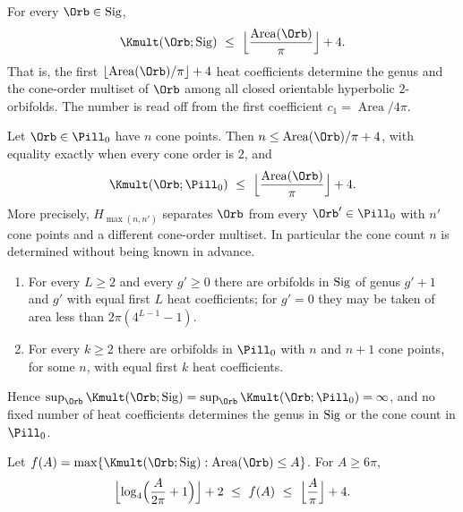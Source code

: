 \begin{corollary}\label{cor:sigarea}
For every $\Orb\in\Sig$,
\[
  \Kmult(\Orb;\Sig)\ \le\ \Bigl\lfloor\frac{\operatorname{Area}(\Orb)}{\pi}\Bigr\rfloor+4 .
\]
That is, the first $\lfloor\operatorname{Area}(\Orb)/\pi\rfloor+4$ heat coefficients determine the genus and
the cone-order multiset of $\Orb$ among all closed orientable hyperbolic $2$-orbifolds. The number is
read off from the first coefficient $c_1=\operatorname{Area}/4\pi$.
\end{corollary}

\begin{theorem}\label{thm:sigcount}
Let $\Orb\in\Pill_0$ have $n$ cone points. Then $n\le\operatorname{Area}(\Orb)/\pi+4$, with equality exactly
when every cone order is $2$, and
\[
  \Kmult(\Orb;\Pill_0)\ \le\ \Bigl\lfloor\frac{\operatorname{Area}(\Orb)}{\pi}\Bigr\rfloor+4 .
\]
More precisely, $H_{\max(n,n')}$ separates $\Orb$ from every $\Orb'\in\Pill_0$ with $n'$ cone points and a
different cone-order multiset. In particular the cone count $n$ is determined without being known in
advance.
\end{theorem}

\begin{theorem}\label{thm:signonuniform}
\leavevmode
\begin{enumerate}[label=(\alph*)]
\item For every $L\ge2$ and every $g'\ge0$ there are orbifolds in $\mathrm{Sig}$ of genus $g'+1$ and $g'$ with equal
  first $L$ heat coefficients; for $g'=0$ they may be taken of area less than $2\pi(4^{L-1}-1)$.
\item For every $k\ge2$ there are orbifolds in $\Pill_0$ with $n$ and $n+1$ cone points, for some $n$, with
  equal first $k$ heat coefficients.
\end{enumerate}
Hence $\sup_{\Orb}\Kmult(\Orb;\Sig)=\sup_{\Orb}\Kmult(\Orb;\Pill_0)=\infty$, and no fixed number of heat
coefficients determines the genus in $\mathrm{Sig}$ or the cone count in $\Pill_0$.
\end{theorem}

\begin{corollary}[Growth]\label{cor:siggrowth}
Let $f(A)=\max\{\Kmult(\Orb;\Sig):\operatorname{Area}(\Orb)\le A\}$. For $A\ge6\pi$,
\[
  \Bigl\lfloor\log_4\Bigl(\frac{A}{2\pi}+1\Bigr)\Bigr\rfloor+2\ \le\ f(A)\ \le\ \Bigl\lfloor\frac{A}{\pi}\Bigr\rfloor+4 .
\]
\end{corollary}

